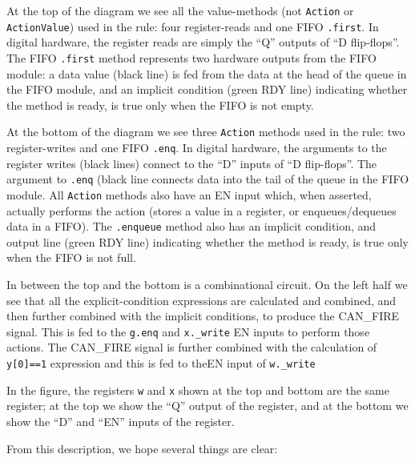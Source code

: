 At the top of the diagram we see all the value-methods (not
\verb|Action| or \verb|ActionValue|) used in the rule: four
register-reads and one FIFO \verb|.first|.  In digital hardware, the
register reads are simply the ``Q'' outputs of ``D flip-flops''.  The
FIFO \verb|.first| method represents two hardware outputs from the
FIFO module: a data value (black line) is fed from the data at the
head of the queue in the FIFO module, and an implicit condition (green
RDY line) indicating whether the method is ready, {\ie} is true only
when the FIFO is not empty.

At the bottom of the diagram we see three \verb|Action| methods used
in the rule: two register-writes and one FIFO \verb|.enq|.  In digital
hardware, the arguments to the register writes (black lines) connect
to the ``D'' inputs of ``D flip-flops''. The argument to \verb|.enq|
(black line connects data into the tail of the queue in the FIFO
module.  All \verb|Action| methods also have an EN input which, when
asserted, actually performs the action (stores a value in a register,
or enqueues/dequeues data in a FIFO).  The \verb|.enqueue| method also
has an implicit condition, and output line (green RDY line) indicating
whether the method is ready, {\ie} is true only when the FIFO is not
full.

In between the top and the bottom is a combinational circuit.  On the
left half we see that all the explicit-condition expressions are
calculated and combined, and then further combined with the implicit
conditions, to produce the CAN\_FIRE signal.  This is fed to the
\verb|g.enq| and \verb|x._write| EN inputs to perform those actions.
The CAN\_FIRE signal is further combined with the calculation of
\verb|y[0]==1| expression and this is fed to theEN input of
\verb|w._write|

In the figure, the registers \verb|w| and \verb|x| shown at the top
and bottom are the same register; at the top we show the ``Q'' output
of the register, and at the bottom we show the ``D'' and ``EN'' inputs
of the register.

From this description, we hope several things are clear:

